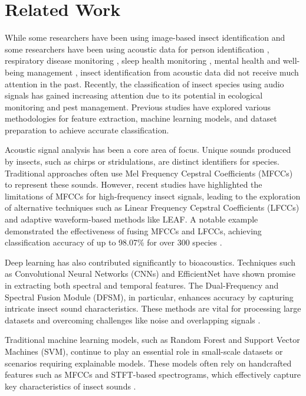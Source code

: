 \section{Related Work}
While some researchers have been using image-based insect identification and some researchers have been using acoustic data for person identification \cite{dibbo2022phone, cheung2020continuous}, respiratory disease monitoring \cite{vhaduri2019towards, dibbo2021effect}, sleep health monitoring \cite{vhaduri2020nocturnal, vhaduri2018impact, chen2020estimating}, mental health and well-being management \cite{kim2020understanding, vhaduri2021deriving, vhaduri2021predicting}, insect identification from acoustic data did not receive much attention in the past. Recently, the classification of insect species using audio signals has gained increasing attention due to its potential in ecological monitoring and pest management. Previous studies have explored various methodologies for feature extraction, machine learning models, and dataset preparation to achieve accurate classification.

Acoustic signal analysis has been a core area of focus. Unique sounds produced by insects, such as chirps or stridulations, are distinct identifiers for species. Traditional approaches often use Mel Frequency Cepstral Coefficients (MFCCs) to represent these sounds. However, recent studies have highlighted the limitations of MFCCs for high-frequency insect signals, leading to the exploration of alternative techniques such as Linear Frequency Cepstral Coefficients (LFCCs) and adaptive waveform-based methods like LEAF. A notable example demonstrated the effectiveness of fusing MFCCs and LFCCs, achieving classification accuracy of up to 98.07\% for over 300 species \cite{acoustic_insect_mfcc_lfcc,adaptive_insect_classification}.

Deep learning has also contributed significantly to bioacoustics. Techniques such as Convolutional Neural Networks (CNNs) and EfficientNet have shown promise in extracting both spectral and temporal features. The Dual-Frequency and Spectral Fusion Module (DFSM), in particular, enhances accuracy by capturing intricate insect sound characteristics. These methods are vital for processing large datasets and overcoming challenges like noise and overlapping signals \cite{adaptive_insect_classification,dfsm_insect_classification}.

Traditional machine learning models, such as Random Forest and Support Vector Machines (SVM), continue to play an essential role in small-scale datasets or scenarios requiring explainable models. These models often rely on handcrafted features such as MFCCs and STFT-based spectrograms, which effectively capture key characteristics of insect sounds \cite{dfsm_insect_classification,ml_insect_bioacoustics}.


